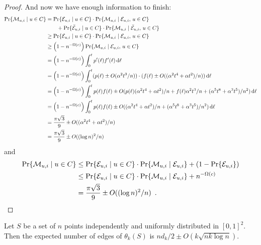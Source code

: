 \documentclass{patmorin}
\begin{document}
\begin{proof}
And now we have enough information to finish:
\begin{align*}
    \Pr\{\mathcal{M}_{u,i} \mid u\in C\} 
         & = \Pr\{\mathcal{E}_{u,i}\mid u\in C\}\cdot \Pr\{\mathcal{M}_{u,i}\mid \mathcal{E}_{u,i},\,u\in C\} 
            \\ & \qquad {}+\Pr\{\bar{\mathcal{E}}_{u,i}\mid u\in C\}\cdot\Pr\{\mathcal{M}_{u,i}\mid\bar{\mathcal{E}}_{u,i},\,u\in C\} \\
         & \ge \Pr\{\mathcal{E}_{u,i}\mid u\in C\}\cdot \Pr\{\mathcal{M}_{u,i}\mid \mathcal{E}_{u,i},\,u\in C\} \\
         & \ge \left(1-n^{-\Omega(c)}\right)
                \Pr\{\mathcal{M}_{u,i}\mid \mathcal{E}_{u,i},\,u\in C\} \\
         & = \left(1-n^{-\Omega(c)}\right)
                 \int_0^t p'(\ell)f'(\ell)\,\mathrm{d}\ell \\
         & = \left(1-n^{-\Omega(c)}\right)
            \int_0^t (p(\ell)\pm O(\alpha^2t^3/n))
           \cdot(f(\ell)\pm O((\alpha^2 t^4+\alpha t^2)/n))\,\mathrm{d}{\ell} \\
         & = \left(1-n^{-\Omega(c)}\right)\int_0^t p(\ell)f(\ell)
           \pm O(p(\ell)(\alpha^2t^4+\alpha t^2)/n + f(\ell)\alpha^2t^3/n + (\alpha^5t^8+\alpha^3t^5)/n^2)
            \,\mathrm{d}{\ell} \\
         & = \left(1-n^{-\Omega(c)}\right)\int_0^t p(\ell)f(\ell)
           \pm O((\alpha^2t^4+\alpha t^2)/n + (\alpha^5t^8+\alpha^3t^5)/n^2)
            \,\mathrm{d}{\ell} \\
        & = \frac{\pi\sqrt{3}}{9} \pm O((\alpha^2t^4+\alpha t^2)/n) \\
        & =  \frac{\pi\sqrt{3}}{9} \pm O((\log n)^2/n)
\end{align*}
and
\begin{align*}
    \Pr\{\mathcal{M}_{u,i} \mid u\in C\} 
       & \le \Pr\{\mathcal{E}_{u,i}\mid u\in C\}\cdot \Pr\{\mathcal{M}_{u,i}\mid \mathcal{E}_{u,i}\}
           + (1-\Pr\{\mathcal{E}_{u,i}\}) \\
       & \le \Pr\{\mathcal{E}_{u,i}\mid u\in C\}\cdot \Pr\{\mathcal{M}_{u,i}\mid \mathcal{E}_{u,i}\} 
           + n^{-\Omega(c)} \\
         & = \frac{\pi\sqrt{3}}{9} \pm O((\log n)^2/n) \enspace . \qedhere
\end{align*} 
\end{proof}

\begin{lem}
 Let $S$ be a set of $n$ points independently and uniformly distributed
 in $[0,1]^2$.  Then the expected number of edges of $\theta_k(S)$ is 
 $nd_k/2\pm O(k\sqrt{nk\log n})$.
\end{lem}
\end{document}

